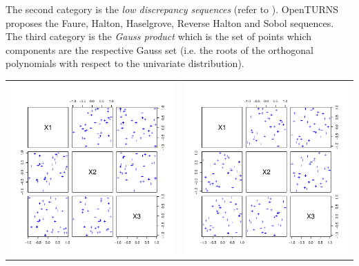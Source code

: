 {      The second category is the {\itshape low discrepancy sequences} (refer to ). OpenTURNS proposes the Faure, Halton, Haselgrove, Reverse Halton and Sobol sequences.\\


      The third category is the {\itshape Gauss product} which is the set of points which components are the respective Gauss set (i.e. the roots of the orthogonal polynomials with respect to the univariate distribution).

      \newpage
      \begin{center}
        \begin{tabular}{cc}
          \includegraphics[width=8cm]{Figures/MonteCarlo_DOE.pdf} & \includegraphics[width=8cm]{Figures/LHS_DOE.pdf}\\

\end{tabular}
\end{center}}
